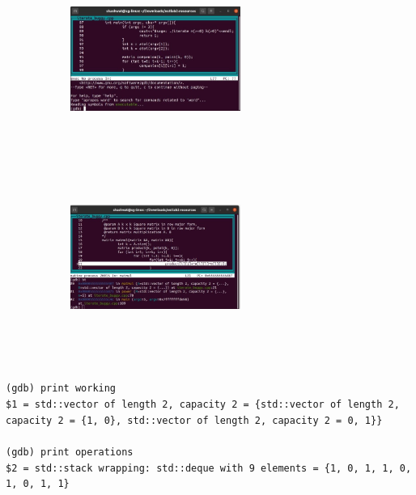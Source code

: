 \documentclass[a4paper,12pt]{article}
\numberwithin{definition}{section}
\numberwithin{mytheorem}{subsection}
\begin{document}
\begin{figure}[h]

\begin{subfigure}{210}
\includegraphics[width=210, height=6cm]{First Screenshot.jpeg} 

\end{subfigure}
\begin{subfigure}{210}
\includegraphics[width=210, height=6cm]{Second Screenshot.jpeg}

\end{subfigure}

\end{figure}
\\
\texttt{(gdb) print working}\\
\texttt{\$1 = std::vector of length 2, capacity 2 = \{std::vector of length 2, capacity 2 = \{1, 0\}, std::vector of length 2, capacity 2 = {0, 1}\}\}}\\\\
\texttt{(gdb) print operations}\\
\texttt{\$2 = std::stack wrapping: std::deque with 9 elements = \{1, 0, 1, 1, 0, 1, 0, 1, 1\}}\\\\
\end{document}
